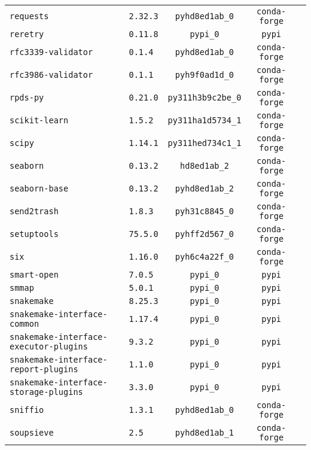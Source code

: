 \begin{longtable}{p{}|l|ccc}
\texttt{requests} & \texttt{2.32.3} & \texttt{pyhd8ed1ab\_0} & \texttt{conda-forge} \\
\texttt{reretry} & \texttt{0.11.8} & \texttt{pypi\_0} & \texttt{pypi} \\
\texttt{rfc3339-validator} & \texttt{0.1.4} & \texttt{pyhd8ed1ab\_0} & \texttt{conda-forge} \\
\texttt{rfc3986-validator} & \texttt{0.1.1} & \texttt{pyh9f0ad1d\_0} & \texttt{conda-forge} \\
\texttt{rpds-py} & \texttt{0.21.0} & \texttt{py311h3b9c2be\_0} & \texttt{conda-forge} \\
\texttt{scikit-learn} & \texttt{1.5.2} & \texttt{py311ha1d5734\_1} & \texttt{conda-forge} \\
\texttt{scipy} & \texttt{1.14.1} & \texttt{py311hed734c1\_1} & \texttt{conda-forge} \\
\texttt{seaborn} & \texttt{0.13.2} & \texttt{hd8ed1ab\_2} & \texttt{conda-forge} \\
\texttt{seaborn-base} & \texttt{0.13.2} & \texttt{pyhd8ed1ab\_2} & \texttt{conda-forge} \\
\texttt{send2trash} & \texttt{1.8.3} & \texttt{pyh31c8845\_0} & \texttt{conda-forge} \\
\texttt{setuptools} & \texttt{75.5.0} & \texttt{pyhff2d567\_0} & \texttt{conda-forge} \\
\texttt{six} & \texttt{1.16.0} & \texttt{pyh6c4a22f\_0} & \texttt{conda-forge} \\
\texttt{smart-open} & \texttt{7.0.5} & \texttt{pypi\_0} & \texttt{pypi} \\
\texttt{smmap} & \texttt{5.0.1} & \texttt{pypi\_0} & \texttt{pypi} \\
\texttt{snakemake} & \texttt{8.25.3} & \texttt{pypi\_0} & \texttt{pypi} \\
\texttt{snakemake-interface-common} & \texttt{1.17.4} & \texttt{pypi\_0} & \texttt{pypi} \\
\texttt{snakemake-interface-executor-plugins} & \texttt{9.3.2} & \texttt{pypi\_0} & \texttt{pypi} \\
\texttt{snakemake-interface-report-plugins} & \texttt{1.1.0} & \texttt{pypi\_0} & \texttt{pypi} \\
\texttt{snakemake-interface-storage-plugins} & \texttt{3.3.0} & \texttt{pypi\_0} & \texttt{pypi} \\
\texttt{sniffio} & \texttt{1.3.1} & \texttt{pyhd8ed1ab\_0} & \texttt{conda-forge} \\
\texttt{soupsieve} & \texttt{2.5} & \texttt{pyhd8ed1ab\_1} & \texttt{conda-forge} \\

\end{longtable}
